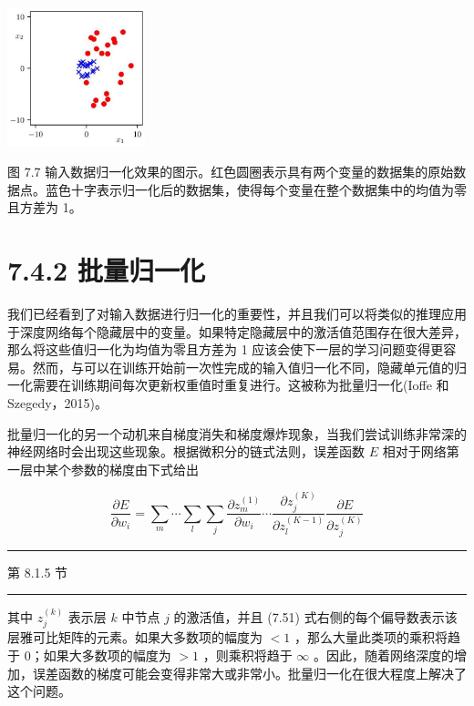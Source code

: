 \documentclass[10pt]{article}
\newcommand{\HRule}{\begin{center}\rule{0.9\linewidth}{0.2mm}\end{center}}
\begin{document}
\begin{center}
\includegraphics[max width=0.3\textwidth]{images/0194e279-9b28-703a-88f4-c3ac21e2010d_245_1079_1500_474_478_0.jpg}
\end{center}
\hspace*{3em} 

图 7.7 输入数据归一化效果的图示。红色圆圈表示具有两个变量的数据集的原始数据点。蓝色十字表示归一化后的数据集，使得每个变量在整个数据集中的均值为零且方差为 1。

\section*{7.4.2 批量归一化}

我们已经看到了对输入数据进行归一化的重要性，并且我们可以将类似的推理应用于深度网络每个隐藏层中的变量。如果特定隐藏层中的激活值范围存在很大差异，那么将这些值归一化为均值为零且方差为 1 应该会使下一层的学习问题变得更容易。然而，与可以在训练开始前一次性完成的输入值归一化不同，隐藏单元值的归一化需要在训练期间每次更新权重值时重复进行。这被称为批量归一化(Ioffe 和 Szegedy，2015)。

批量归一化的另一个动机来自梯度消失和梯度爆炸现象，当我们尝试训练非常深的神经网络时会出现这些现象。根据微积分的链式法则，误差函数 \(E\) 相对于网络第一层中某个参数的梯度由下式给出

\[
\frac{\partial E}{\partial {w}_{i}} = \mathop{\sum }\limits_{m}\cdots \mathop{\sum }\limits_{l}\mathop{\sum }\limits_{j}\frac{\partial {z}_{m}^{\left( 1\right) }}{\partial {w}_{i}}\cdots \frac{\partial {z}_{j}^{\left( K\right) }}{\partial {z}_{l}^{\left( K - 1\right) }}\frac{\partial E}{\partial {z}_{j}^{\left( K\right) }} \tag{7.51}
\]

\HRule

第 8.1.5 节

\HRule

其中 \({z}_{j}^{\left( k\right) }\) 表示层 \(k\) 中节点 \(j\) 的激活值，并且 (7.51) 式右侧的每个偏导数表示该层雅可比矩阵的元素。如果大多数项的幅度为 \(< 1\) ，那么大量此类项的乘积将趋于 0；如果大多数项的幅度为 \(> 1\) ，则乘积将趋于 \(\infty\) 。因此，随着网络深度的增加，误差函数的梯度可能会变得非常大或非常小。批量归一化在很大程度上解决了这个问题。
\end{document}
